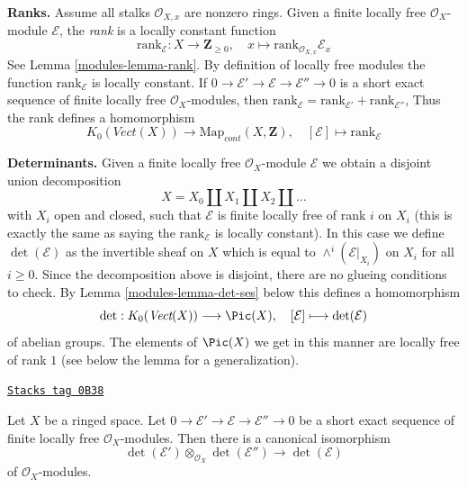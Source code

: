 \medskip\noindent
{\bf Ranks.} Assume all stalks $\mathcal{O}_{X, x}$ are nonzero rings.
Given a finite locally free $\mathcal{O}_X$-module $\mathcal{E}$,
the {\it rank} is a locally constant function
$$
\text{rank}_\mathcal{E} : X \longrightarrow \mathbf{Z}_{\geq 0},\quad
x \longmapsto \text{rank}_{\mathcal{O}_{X, x}} \mathcal{E}_x
$$
See Lemma \ref{modules-lemma-rank}. By definition of locally free
modules the function $\text{rank}_\mathcal{E}$ is locally constant. If
$0 \to \mathcal{E}' \to \mathcal{E} \to \mathcal{E}'' \to 0$
is a short exact sequence of finite locally free $\mathcal{O}_X$-modules,
then $\text{rank}_\mathcal{E} = \text{rank}_{\mathcal{E}'} +
\text{rank}_{\mathcal{E}''}$,
Thus the rank defines a homomorphism
$$
K_0(\textit{Vect}(X)) \longrightarrow \text{Map}_{cont}(X, \mathbf{Z}),\quad
[\mathcal{E}] \longmapsto \text{rank}_\mathcal{E}
$$

\medskip\noindent
{\bf Determinants.} Given a  finite locally free
$\mathcal{O}_X$-module $\mathcal{E}$ we obtain a disjoint union
decomposition
$$
X = X_0 \amalg X_1 \amalg X_2 \amalg \ldots
$$
with $X_i$ open and closed, such that $\mathcal{E}$ is finite locally
free of rank $i$ on $X_i$ (this is exactly the same as saying the
$\text{rank}_\mathcal{E}$ is locally constant). In this case we define
$\det(\mathcal{E})$ as the invertible sheaf on $X$ which is equal to
$\wedge^i(\mathcal{E}|_{X_i})$ on $X_i$ for all $i \geq 0$.
Since the decomposition above is disjoint, there are no glueing
conditions to check. By Lemma \ref{modules-lemma-det-ses} below
this defines a homomorphism
$$
\det : K_0(\textit{Vect}(X)) \longrightarrow \Pic(X),\quad
[\mathcal{E}] \longmapsto \det(\mathcal{E})
$$
of abelian groups. The elements of $\Pic(X)$ we get in this manner
are locally free of rank $1$ (see below the lemma for a generalization).

\begin{lemma}
\label{modules-lemma-det-ses}
\href{https://stacks.math.columbia.edu/tag/0B38}{\texttt{Stacks tag 0B38}}

Let $X$ be a ringed space. Let
$0 \to \mathcal{E}' \to \mathcal{E} \to \mathcal{E}'' \to 0$
be a short exact sequence of finite locally free $\mathcal{O}_X$-modules.
Then there is a canonical isomorphism
$$
\det(\mathcal{E}') \otimes_{\mathcal{O}_X}\det(\mathcal{E}'')
\longrightarrow
\det(\mathcal{E})
$$
of $\mathcal{O}_X$-modules.
\end{lemma}

